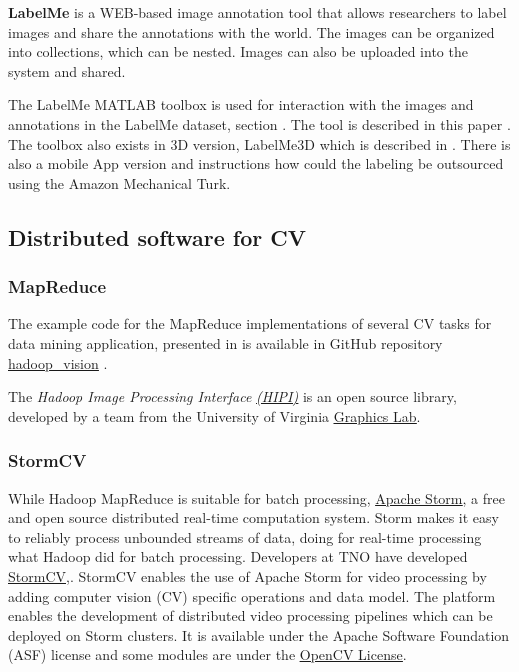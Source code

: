 {{\bf LabelMe} is a WEB-based image annotation tool that allows researchers to label images and share the annotations with the world. The images can be organized into collections, which can be nested. Images can also be uploaded into the system and shared.

The LabelMe MATLAB toolbox is used for interaction with the images and annotations in the LabelMe dataset, section . The tool is described in this paper
\cite{Russell2008}. The toolbox also exists in 3D version, LabelMe3D which is described in \cite{Russell2009}. There is also a mobile App version and instructions how could the labeling be outsourced using the Amazon Mechanical Turk.

\subsection{Distributed software for CV}

\subsubsection{MapReduce}\label{subsubsec:MapReduce}
The example code for the MapReduce implementations of several CV tasks for data mining application, presented in \cite{White:2010} is available in  GitHub repository \href{https://github.com/bwhite/hadoop_vision}{\underline{hadoop\_vision}} \cite{hadoopvision_soft}.

The {\em Hadoop Image Processing Interface} \href{http://hipi.cs.virginia.edu}{\em \underline{(HIPI)}} \cite{hipi_soft} is an open source library, developed by a team from the University of Virginia \href{http://www.cs.virginia.edu/~gfx/pmwiki/index.php}{\underline{Graphics Lab}}.

\subsubsection{StormCV}\label{subsubsec:StormCV}
While Hadoop MapReduce is suitable for batch processing, \href{https://storm.apache.org/}{\underline{Apache Storm}},\cite{storm_soft} a free and open source distributed real-time computation system. Storm makes it easy to reliably process unbounded streams of data, doing for real-time processing what Hadoop did for batch processing.
Developers at TNO have developed  \href{https://github.com/sensorstorm/StormCV}{\underline{StormCV}},\cite{stormcv_soft}. StormCV enables the use of Apache Storm for video processing by adding computer vision (CV) specific operations and data model. The platform enables the development of distributed video processing pipelines which can be deployed on Storm clusters. It is available under the  Apache Software Foundation (ASF) license and some modules are under the \href{http://opencv.org/license.html}{\underline{OpenCV License}}.

}
